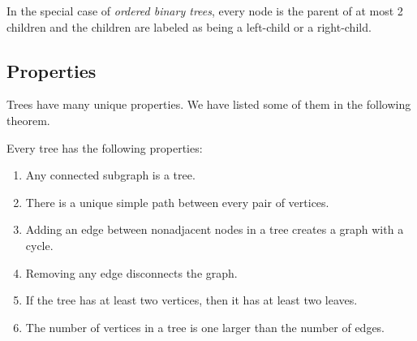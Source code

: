 In the special case of \emph{ordered binary trees}, every node is the
parent of at most 2 children and the children are labeled as being a
left-child or a right-child.

\subsection{Properties}

Trees have many unique properties.  We have listed some of them in the
following theorem.

\begin{theorem}\label{th:treeprops}
Every tree has the following properties:

\begin{enumerate}

\item Any connected subgraph is a tree.\label{asub}

\item There is a unique simple path between every pair of vertices.

\item Adding an edge between nonadjacent nodes in a tree creates a
  graph with a cycle.

\item Removing any edge disconnects the graph.

\item If the tree has at least two vertices, then it has at least two
  leaves.

\item The number of vertices in a tree is one larger than the number
  of edges.

\end{enumerate}
\end{theorem}

